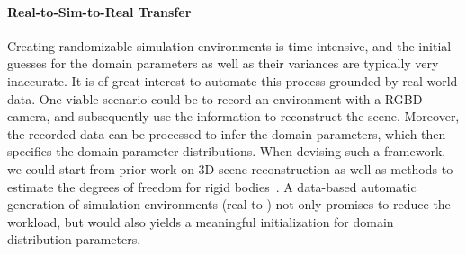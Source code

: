 \documentclass[utf8]{frontiersSCNS} %
\begin{document}
\paragraph*{Real-to-Sim-to-Real Transfer}
Creating randomizable simulation environments is time-intensive, and the initial guesses for the domain parameters as well as their variances are typically very inaccurate.
It is of great interest to automate this process grounded by real-world data.
One viable scenario could be to record an environment with a \acs{RGBD} camera, and subsequently use the information to reconstruct the scene.
Moreover, the recorded data can be processed to infer the domain parameters, which then specifies the domain parameter distributions.
When devising such a framework, we could start from prior work on 3D scene reconstruction \cite{Kolev_etal_2009,Haefner_etal_2018} as well as methods to estimate the degrees of freedom for rigid bodies~\citep{MartinMartin_Brock_2014}.
A data-based automatic generation of simulation environments (real-to-\simtoreal) not only promises to reduce the workload, but would also yields a meaningful initialization for domain distribution parameters.

\end{document}
